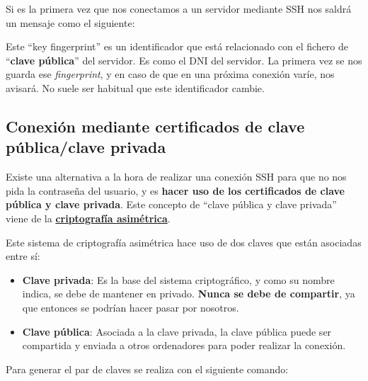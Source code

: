 Si es la primera vez que nos conectamos a un servidor mediante SSH nos saldrá un mensaje como el siguiente:


Este “key fingerprint” es un identificador que está relacionado con el fichero de “\textbf{clave pública}” del servidor. Es como el DNI del servidor. La primera vez se nos guarda ese \textit{fingerprint}, y en caso de que en una próxima conexión varíe, nos avisará. No suele ser habitual que este identificador cambie.


\hypertarget{ssh_clave_publica_privada}{}
\subsection{Conexión mediante certificados de clave pública/clave privada}

Existe una alternativa a la hora de realizar una conexión SSH para que no nos pida la contraseña del usuario, y es \textbf{hacer uso de los certificados de clave pública y clave privada}. Este concepto de “clave pública y clave privada” viene de la \href{https://es.wikipedia.org/wiki/Criptograf%C3%ADa_asim%C3%A9trica}{\textbf{criptografía asimétrica}}.

Este sistema de criptografía asimétrica hace uso de dos claves que están asociadas entre sí:
\begin{itemize}
    \item \textbf{Clave privada}: Es la base del sistema criptográfico, y como su nombre indica, se debe de mantener en privado. \textbf{Nunca se debe de compartir}, ya que entonces se podrían hacer pasar por nosotros.
    \item \textbf{Clave pública}: Asociada a la clave privada, la clave pública puede ser compartida y enviada a otros ordenadores para poder realizar la conexión.
\end{itemize}

Para generar el par de claves se realiza con el siguiente comando:

